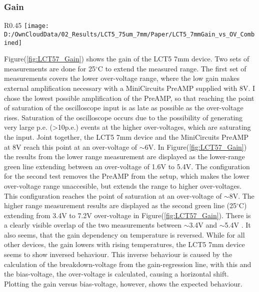 \documentclass[12pt,article,type=msc,colorback,accentcolor=tud9c]{tudthesis}
\begin{document}
\clearpage
\subsubsection{Gain}
\label{subsubsec:LCT57Gain}
\begin{wrapfigure}{R}{0.45\textwidth}
\centering
\texttt{[image: D:/OwnCloudData/02\_Results/LCT5\_75um\_7mm/Paper/LCT5\_7mmGain\_vs\_OV\_Combined]}
\caption{\label{fig:LCT57_Gain}Gain of the HPK LCT5 7mm pixel}
\end{wrapfigure}
Figure(\ref{fig:LCT57_Gain}) shows the gain of the LCT5 7mm device. Two sets of measurements are done for 25$^\circ$C to extend the measured range. The first set of measurements covers the lower over-voltage range, where the low gain makes external amplification necessary with a MiniCircuits PreAMP supplied with 8V. I chose the lowest possible amplification of the PreAMP, so that reaching the point of saturation of the oscilloscope input is as late as possible as the over-voltage rises. Saturation of the oscilloscope occurs due to the possibility of generating very large p.e. (>10p.e.) events at the higher over-voltages, which are saturating the input. Joint together, the LCT5 7mm device and the MiniCircuits PreAMP at 8V reach this point at an over-voltage of $\sim$6V. In Figure(\ref{fig:LCT57_Gain}) the results from the lower range measurement are displayed as the lower-range green line extending between an over-voltage of 1.6V to 5.4V.
The configuration for the second test removes the PreAMP from the setup, which makes the lower over-voltage range unaccesible, but extends the range to higher over-voltages. This configuration reaches the point of saturation at an over-voltage of $\sim$8V. The higher range measurement results are displayed as the second green line (25$^\circ$C) extending from 3.4V to 7.2V over-voltage in Figure(\ref{fig:LCT57_Gain}). There is a clearly visible overlap of the two measurements between $\sim$3.4V and $\sim$5.4V . It also seems, that the gain dependency on temperature is reversed. While for all other devices, the gain lowers with rising temperatures, the LCT5 7mm device seems to show inversed behaviour. This inverse behaviour is caused by the calculation of the breakdown-voltage from the gain-regression line, with this and the bias-voltage, the over-voltage is calculated, causing a horizontal shift. Plotting the gain versus bias-voltage, however, shows the expected behaviour.


\newpage
\end{document}

